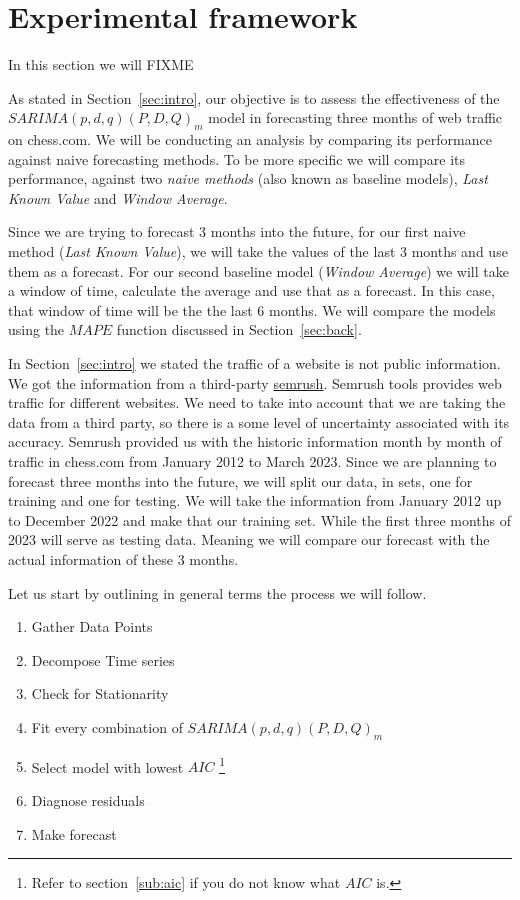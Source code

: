 \documentclass[journal]{IEEEtran}
\begin{document}
\section{Experimental framework}\label{sec:exp}

In this section we will FIXME

As stated in Section~\ref{sec:intro}, our objective is to assess the effectiveness of
the $SARIMA(p,d,q)(P,D,Q)_m$ model in forecasting three months of web traffic
on chess.com. We will be conducting an analysis by comparing its performance
against naive forecasting methods. To be more specific we will compare its
performance, against two \emph{naive methods} (also known as baseline models),
\emph{Last Known Value} and \emph{Window Average}.

Since we are trying to forecast 3 months into the future, for our first naive
method (\emph{Last Known Value}), we will take the values of the last 3 months
and use them as a forecast. For our second baseline model (\emph{Window
Average}) we will take a window of time, calculate the average and use that as
a forecast. In this case, that window of time will be the the last 6 months.
We will compare the models using the $MAPE$ function discussed in
Section~\ref{sec:back}.

In Section~\ref{sec:intro} we stated the traffic of a website is not public
information. We got the information from a third-party
\href{http://semrush.com}{semrush}. Semrush tools provides web traffic for
different websites. We need to take into account that we are taking the data
from a third party, so there is a some level of uncertainty associated with
its accuracy. Semrush provided us with the historic information month by month
of traffic in chess.com from January 2012 to March 2023. Since we are planning
to forecast three months into the future, we will split our data, in sets, one
for training and one for testing. We will take the information from January
2012 up to December 2022 and make that our training set. While the first three
months of 2023 will serve as testing data. Meaning we will compare our
forecast with the actual information of these 3 months.

Let us start by outlining in general terms the process we will follow.

\begin{enumerate}
    \item Gather Data Points
    \item Decompose Time series
    \item Check for Stationarity
    \item Fit every combination of $SARIMA(p,d,q)(P,D,Q)_m$
    \item Select model with lowest $AIC$ \footnote{Refer to
        section~\ref{sub:aic} if you do not know what $AIC$ is.}
    \item Diagnose residuals
    \item Make forecast
\end{enumerate}
\end{document}
